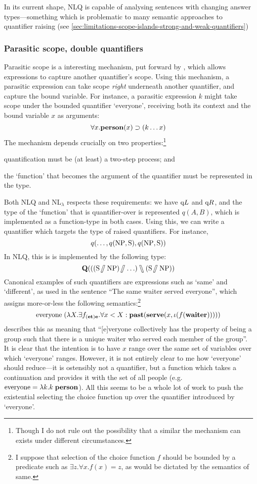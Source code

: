 In its current shape, NLQ is capable of analysing sentences with
changing answer types---something which is problematic to many
semantic approaches to quantifier raising (see
\autoref{sec:limitations-scope-islands-strong-and-weak-quantifiers})





\subsubsection{Parasitic scope, double quantifiers}
Parasitic scope is a interesting mechanism, put forward by
\citet{barker2007}, which allows expressions to capture another
quantifier's scope. Using this mechanism, a parasitic expression can
take scope \emph{right} underneath another quantifier, and capture the
bound variable. For instance, a parasitic expression $k$ might take
scope under the bounded quantifier `everyone', receiving both its
context and the bound variable $x$ as arguments:
\[
  \forall{x}.\PERSON(x)\supset(k\ldots{x})
\]
The mechanism depends crucially on two properties:\footnote{%
  Though I do not rule out the possibility that a similar the
  mechanism can exists under different circumstances.
}
\begin{enumerate*}[label=(\arabic*)]
\item quantification must be (at least) a two-step process; and
\item the `function' that becomes the argument of the quantifier must
  be represented in the type.
\end{enumerate*}
Both NLQ and NL$_\lambda$ respects these requirements: we have $\qup$
and $\qdown$, and the type of the `function' that is quantifier-over
is represented $q(A,B)$, which is implemented as a function-type in
both cases. Using this, we can write a quantifier which targets the
type of raised quantifiers. For instance,
\[
  q(\ldots,q(\NP,\S),q(\NP,\S))
\]
In NLQ, this is is implemented by the following type:
\[
  \q[((\S\himpl\NP)\himpl\ldots)\himpr(\S\himpl\NP)]
\]
Canonical examples of such quantifiers are expressions such as `same'
and `different', as used in the sentence ``The same waiter served
everyone'', which \citet{barker2007} assigns more-or-less the
following semantics:\footnote{%
  I suppose that selection of the choice function $f$ should be
  bounded by a predicate such as $\exists{z}.\forall{x}.f(x)=z$, as
  would be dictated by the semantics of same.
}
\[
  \text{everyone}\;(\lambda{X}.\exists{f_{(\e\t)\e}}.\forall{x<X}:
  \PAST(\SERVE(x,\iota(f(\WAITER)))))
\]
\citeauthor{barker2007} describes this as meaning that ``[e]veryone
collectively has the property of being a group such that there is a
unique waiter who served each member of the group''. It is clear that
the intention is to have $x$ range over the same set of variables over
which `everyone' ranges. However, it is not entirely clear to me how
`everyone' should reduce---it is ostensibly not a quantifier, but a
function which takes a continuation and provides it with the set of
all people (e.g.\ $\text{everyone}=\lambda{k}.k\;\PERSON$). All this
seems to be a whole lot of work to push the existential selecting the
choice function up over the quantifier introduced by `everyone'.

